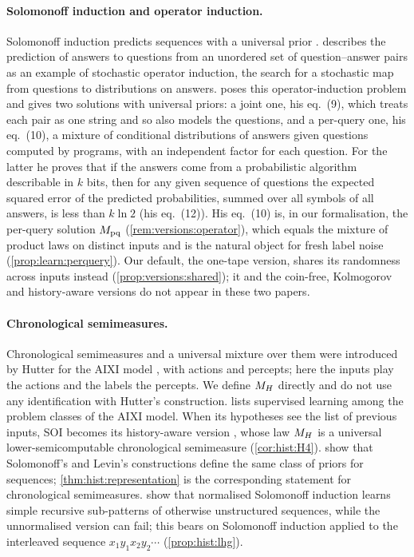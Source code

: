 \paragraph{Solomonoff induction and operator induction.} Solomonoff induction predicts sequences with a universal prior \citep{solomonoff1978complexity,li2008introduction}. \citet{solomonoff1999two} describes the prediction of answers to questions from an unordered set of question--answer pairs as an example of stochastic operator induction, the search for a stochastic map from questions to distributions on answers. \citet[\S4]{solomonoff2008three} poses this operator-induction problem and gives two solutions with universal priors: a joint one, his eq.~(9), which treats each pair as one string and so also models the questions, and a per-query one, his eq.~(10), a mixture of conditional distributions of answers given questions computed by programs, with an independent factor for each question. For the latter he proves that if the answers come from a probabilistic algorithm describable in $k$ bits, then for any given sequence of questions the expected squared error of the predicted probabilities, summed over all symbols of all answers, is less than $k\ln2$ (his eq.~(12)). His eq.~(10) is, in our formalisation, the per-query solution $M_{\mathrm{pq}}$ (\cref{rem:versions:operator}), which equals the mixture of product laws on distinct inputs and is the natural object for fresh label noise (\cref{prop:learn:perquery}). Our default, the one-tape version, shares its randomness across inputs instead (\cref{prop:versions:shared}); it and the coin-free, Kolmogorov and history-aware versions do not appear in these two papers.

\paragraph{Chronological semimeasures.}\label{rem:learn:hutterEX}
Chronological semimeasures and a universal mixture over them were introduced by Hutter for the AIXI model \citep{hutter2000theory,hutter2005universal}, with actions and percepts; here the inputs play the actions and the labels the percepts. We define $M_{H}$ directly and do not use any identification with Hutter's construction. \citet{hutter2007aixi} lists supervised learning among the problem classes of the AIXI model. When its hypotheses see the list of previous inputs, SOI becomes its history-aware version \SFIhist{}, whose law $M_{H}$ is a universal lower-semicomputable chronological semimeasure (\cref{cor:hist:H4}). \citet{wood2013non} show that Solomonoff's and Levin's constructions define the same class of priors for sequences; \cref{thm:hist:representation} is the corresponding statement for chronological semimeasures. \citet{lattimore2011universal} show that normalised Solomonoff induction learns simple recursive sub-patterns of otherwise unstructured sequences, while the unnormalised version can fail; this bears on Solomonoff induction applied to the interleaved sequence $x_1y_1x_2y_2\cdots$ (\cref{prop:hist:lhg}).

